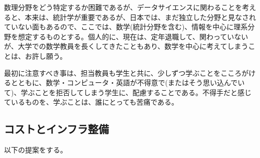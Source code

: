 \documentclass[
]{book}
\theoremstyle{definition}
\theoremstyle{definition}
\theoremstyle{definition}
\theoremstyle{definition}
\theoremstyle{remark}
\begin{document}
数理分野をどう特定するか困難であるが、データサイエンスに関わることを考えると、本来は、統計学が重要であるが、日本では、まだ独立した分野と見なされていない面もあるので、ここでは、数学(統計分野を含む)、情報を中心に理系分野を想定するものとする。個人的に、現在は、定年退職して、関わっていないが、大学での数学教員を長くしてきたこともあり、数学を中心に考えてしまうことは、お許し願う。

最初に注意すべき事は、担当教員も学生と共に、少しずつ学ぶことをこころがけるとともに、数学・コンピュータ・英語が不得意で(またはそう思い込んでいて)、学ぶことを拒否してしまう学生に、配慮することである。不得手だと感じているものを、学ぶことは、誰にとっても苦痛である。

\hypertarget{ux30b3ux30b9ux30c8ux3068ux30a4ux30f3ux30d5ux30e9ux6574ux5099}{%
\subsection{コストとインフラ整備}\label{ux30b3ux30b9ux30c8ux3068ux30a4ux30f3ux30d5ux30e9ux6574ux5099}}

以下の提案をする。
\end{document}
